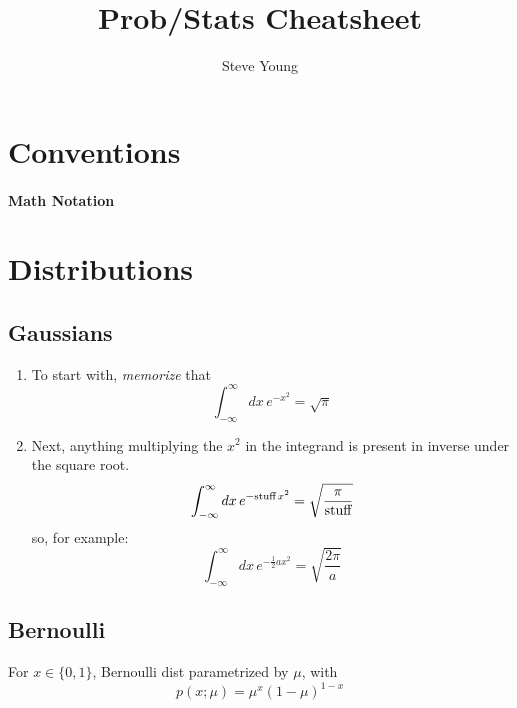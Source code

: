 \documentclass[11pt]{article}
\title{Prob/Stats Cheatsheet}
\author{Steve Young}
\begin{document}
\maketitle

\section{Conventions}
\paragraph{Math Notation}



\section{Distributions}
\subsection{Gaussians}

\begin{enumerate}
  \item To start with, \emph{memorize} that
  \begin{equation}
    \boxed{\int_{-\infty}^{\infty} dx\, e^{-x^2} = \sqrt{\pi}}
  \end{equation}

  \item Next, anything multiplying the $x^2$ in the integrand is present in inverse
  under the square root.
  \begin{equation}
    \int_{-\infty}^{\infty} dx\, e^{-\textrm{stuff}\, x^2} = \sqrt{\frac{\pi}{\textrm{stuff}}} 
  \end{equation}
  so, for example:
  \begin{equation}
    \int_{-\infty}^{\infty} dx\, e^{-\frac{1}{2} a x^2} = \sqrt{\frac{2 \pi}{a}}
  \end{equation}

\end{enumerate}

\subsection{Bernoulli}
For $x \in \{0, 1\}$, Bernoulli dist parametrized by $\mu$, with
\begin{equation}
  p(x; \mu) = \mu^x (1-\mu)^{1-x}
\end{equation}
\end{document}
